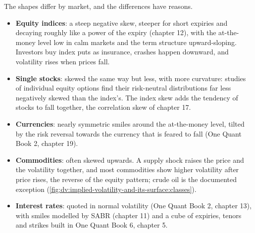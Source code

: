 The shapes differ by market, and the differences have reasons.

\begin{itemize}
\item \textbf{Equity indices}: a steep negative skew, steeper for short expiries and
decaying roughly like a power of the expiry (chapter 12), with the at-the-money level
low in calm markets and the term structure upward-sloping. Investors buy index puts as
insurance, crashes happen downward, and volatility rises when prices fall.
\item \textbf{Single stocks}: skewed the same way but less, with more curvature: studies
of individual equity options find their risk-neutral distributions far less negatively
skewed than the index's. The index skew adds the tendency of stocks to fall together,
the correlation skew of chapter 17.
\item \textbf{Currencies}: nearly symmetric smiles around the at-the-money level, tilted
by the risk reversal towards the currency that is feared to fall (One Quant Book 2,
chapter 19).
\item \textbf{Commodities}: often skewed upwards. A supply shock raises the price and the
volatility together, and most commodities show higher volatility after price rises, the
reverse of the equity pattern; crude oil is the documented exception
(\cref{fig:dv:implied-volatility-and-its-surface:classes}).
\item \textbf{Interest rates}: quoted in normal volatility (One Quant Book 2, chapter 13),
with smiles modelled by SABR (chapter 11) and a cube of expiries, tenors and strikes
built in One Quant Book 6, chapter 5.
\end{itemize}

\begin{omfigure}

\label{fig:dv:implied-volatility-and-its-surface:classes}
\end{omfigure}

